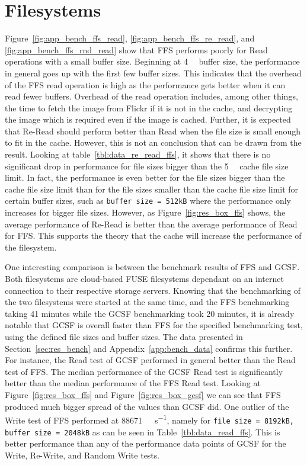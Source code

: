 \section{Filesystems}
Figure~\ref{fig:app_bench_ffs_read}, \ref{fig:app_bench_ffs_re_read}, and \ref{fig:app_bench_ffs_rnd_read} show that FFS performs poorly for Read operations with a small buffer size. Beginning at \SI{4}{\kilo\byte} buffer size, the performance in general goes up with the first few buffer sizes. This indicates that the overhead of the FFS read operation is high as the performance gets better when it can read fewer buffers. Overhead of the read operation includes, among other things, the time to fetch the image from Flickr if it is not in the cache, and decrypting the image which is required even if the image is cached. Further, it is expected that Re-Read should perform better than Read when the file size is small enough to fit in the cache. However, this is not an conclusion that can be drawn from the result. Looking at table~\ref{tbl:data_re_read_ffs}, it shows that there is no significant drop in performance for file sizes bigger than the \SI{5}{\mega\byte} cache file size limit. In fact, the performance is even better for the file sizes bigger than the cache file size limit than for the file sizes smaller than the cache file size limit for certain buffer sizes, such as \texttt{buffer size = 512kB} where the performance only increases for bigger file sizes. However, as Figure~\ref{fig:res_box_ffs} shows, the average performance of Re-Read is better than the average performance of Read for FFS. This supports the theory that the cache will increase the performance of the filesystem.

One interesting comparison is between the benchmark results of FFS and GCSF. Both filesystems are cloud-based FUSE filesystems dependant on an internet connection to their respective storage servers. Knowing that the benchmarking of the two filesystems were started at the same time, and the FFS benchmarking taking 41 minutes while the GCSF benchmarking took 20 minutes, it is already notable that GCSF is overall faster than FFS for the specified benchmarking test, using the defined file sizes and buffer sizes. The data presented in Section~\ref{sec:res_bench} and Appendix~\ref{app:bench_data} confirms this further. For instance, the Read test of GCSF performed in general better than the Read test of FFS. The median performance of the GCSF Read test is significantly better than the median performance of the FFS Read test. Looking at Figure~\ref{fig:res_box_ffs} and Figure~\ref{fig:res_box_gcsf} we can see that FFS produced much bigger spread of the values than GCSF did. One outlier of the Write test of FFS performed at \SI[per-mode = symbol]{88671}{\kilo\byte\per\second}, namely for \texttt{file size = 8192kB, buffer size = 2048kB} as can be seen in Table~\ref{tbl:data_read_ffs}. This is better performance than any of the performance data points of GCSF for the Write, Re-Write, and Random Write tests.

